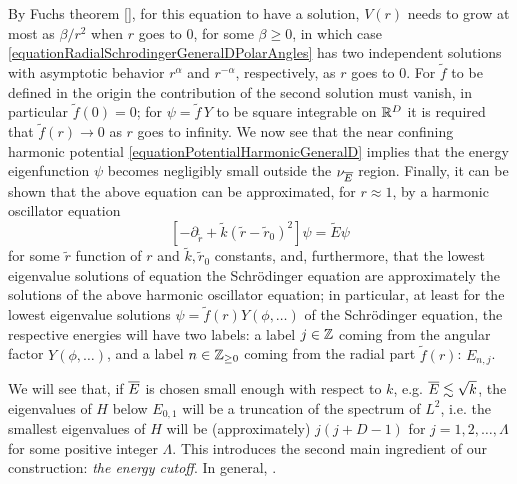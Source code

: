 By Fuchs theorem \ref{}, for this equation to have a solution, $V(r)$ needs to grow at most as $\beta/r^2$ when $r$ goes to $0$, for some $\beta \geq 0$, in which case \ref{equationRadialSchrodingerGeneralDPolarAngles} has two independent solutions with asymptotic behavior $r^\alpha$ and $r^{-\alpha}$, respectively, as $r$ goes to $0$. For $\tilde f$ to be defined in the origin the contribution of the second solution must vanish, in particular $\tilde f(0) = 0$; for $\psi = \tilde f\, Y$ to be square integrable on $\mathbb{R}^D$ it is required that $\tilde f(r) \to 0$ as $r$ goes to infinity.
We now see that the near confining harmonic potential \ref{equationPotentialHarmonicGeneralD} implies that the energy eigenfunction $\psi$ becomes negligibly small outside the $\nu_{\overline{E}}$ region.
Finally, it can be shown that the above equation can be approximated, for $r \approx 1$, by a harmonic oscillator equation
\begin{equation} \label{harmonicApproximationRadialSolutionGeneralD}
    [- \partial_{\tilde r} + \tilde k(\tilde r - \tilde r_0)^2]\psi = \tilde E \psi
\end{equation} 
for some $\tilde r$ function of $r$ and $\tilde k, \tilde r_0$ constants, and, furthermore, that the lowest eigenvalue solutions of equation the Schr\"odinger equation are approximately the solutions of the above harmonic oscillator equation; in particular, at least for the lowest eigenvalue solutions $\psi = \tilde f(r) Y(\phi, \dots)$ of the Schr\"odinger equation, the respective energies will have two labels: a label $j \in \mathbb{Z}$ coming from the angular factor $Y(\phi, \dots)$, and a label $n \in \mathbb{Z}_{\geq 0}$ coming from the radial part $\tilde f(r)$: $E_{n, j}$.

\lin

We will see that, if $\overline{E}$ is chosen small enough with respect to $k$, e.g. $\overline{E} \lesssim \sqrt{k}$, the eigenvalues of $H$ below $E_{0,1}$ will be a truncation of the spectrum of $L^2$, i.e. the smallest eigenvalues of $H$ will be (approximately) $j(j+D-1)$ for $j = 1, 2, \dots, \Lambda$ for some positive integer $\Lambda$. This introduces the second main ingredient of our construction: \textit{the energy cutoff}. In general, .

